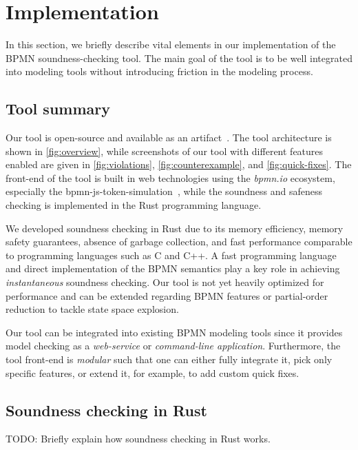 \documentclass[runningheads]{llncs}
\begin{document}
\section{Implementation} \label{sec:impl}

In this section, we briefly describe vital elements in our implementation of the BPMN soundness-checking tool.
The main goal of the tool is to be well integrated into modeling tools without introducing friction in the modeling process.

\subsection{Tool summary}
Our tool is open-source and available as an artifact~\cite{noauthorgivenBPM2024Artifacts2024}.
The tool architecture is shown in \autoref{fig:overview}, while screenshots of our tool with different features enabled are given in \autoref{fig:violations}, \autoref{fig:counterexample}, and \autoref{fig:quick-fixes}.
The front-end of the tool is built in web technologies using the \textit{bpmn.io} ecosystem, especially the bpmn-js-token-simulation~\cite{camundaservicesgmbhBpmnjsTokenSimulation2024}, while the soundness and safeness checking is implemented in the Rust programming language.

We developed soundness checking in Rust due to its memory efficiency, memory safety guarantees, absence of garbage collection, and fast performance comparable to programming languages such as C and C++.
A fast programming language and direct implementation of the BPMN semantics play a key role in achieving \textit{instantaneous} soundness checking.
Our tool is not yet heavily optimized for performance and can be extended regarding BPMN features or partial-order reduction to tackle state space explosion.

Our tool can be integrated into existing BPMN modeling tools since it provides model checking as a \textit{web-service} or \textit{command-line application}.
Furthermore, the tool front-end is \textit{modular} such that one can either fully integrate it, pick only specific features, or extend it, for example, to add custom quick fixes.


\subsection{Soundness checking in Rust}
TODO: Briefly explain how soundness checking in Rust works.
\end{document}
